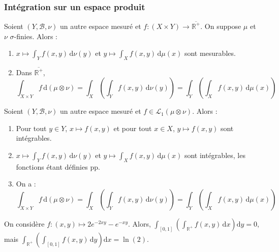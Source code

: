   \subsubsection{Intégration sur un espace produit}


  \begin{theorem}
    Soient $(Y, \mathcal{B}, \nu)$ un autre espace mesuré et $f : (X \times Y) \rightarrow \overline{\mathbb{R}^+}$. On suppose $\mu$ et $\nu$ $\sigma$-finies. Alors :
    \begin{enumerate}[label={\bfseries(\roman*)}]
      \item $x \mapsto \int_Y f(x,y) \, \mathrm{d}\nu(y)$ et $y \mapsto \int_X f(x,y) \, \mathrm{d}\mu(x)$ sont mesurables.
      \item Dans $\overline{\mathbb{R}^+}$,
      \[ \int_{X \times Y} f \, \mathrm{d}(\mu \otimes \nu) = \int_X \left( \int_Y f(x,y) \, \mathrm{d}\nu(y) \right) = \int_Y \left( \int_X f(x,y) \, \mathrm{d}\mu(x) \right) \]
    \end{enumerate}
  \end{theorem}

  \begin{theorem}
    Soient $(Y, \mathcal{B}, \nu)$ un autre espace mesuré et $f \in \mathcal{L}_1 (\mu \otimes \nu)$. Alors :
    \begin{enumerate}[label={\bfseries(\roman*)}]
      \item Pour tout $y \in Y$, $x \mapsto f(x,y)$ et pour tout $x \in X$, $y \mapsto f(x,y)$ sont intégrables.
      \item $x \mapsto \int_Y f(x,y) \, \mathrm{d}\nu(y)$ et $y \mapsto \int_X f(x,y) \, \mathrm{d}\mu(x)$ sont intégrables, les fonctions étant définies pp.
      \item On a :
      \[ \int_{X \times Y} f \, \mathrm{d}(\mu \otimes \nu) = \int_X \left( \int_Y f(x,y) \, \mathrm{d}\nu(y) \right) = \int_Y \left( \int_X f(x,y) \, \mathrm{d}\mu(x) \right) \]
    \end{enumerate}
  \end{theorem}

  \begin{cexample}
    On considère $f : (x,y) \mapsto 2e^{-2xy} - e^{-xy}$. Alors, $\int_{[0,1]} \left( \int_{\mathbb{R}^+} f(x,y) \, \mathrm{d}x \right) \mathrm{d}y = 0$, mais $\int_{\mathbb{R}^+} \left( \int_{[0,1]} f(x,y) \, \mathrm{d}y \right) \mathrm{d}x = \ln(2)$.
  \end{cexample}

